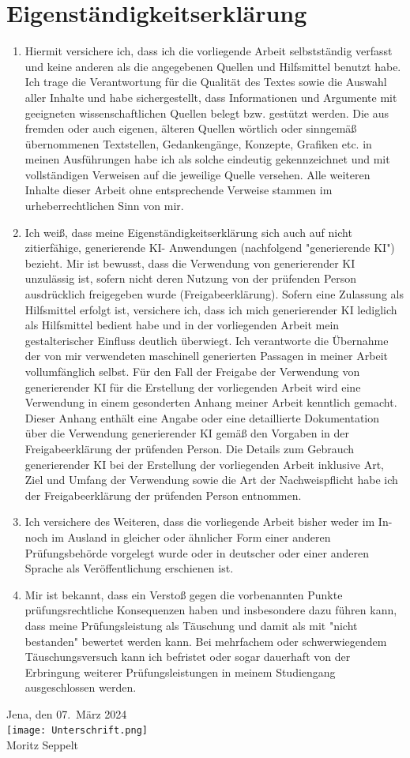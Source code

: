 \documentclass{report}
\theoremstyle{definition}
\begin{document}
\section*{Eigenständigkeitserklärung}
\begin{enumerate}
  \item Hiermit versichere ich, dass ich die vorliegende Arbeit selbstständig verfasst und keine
  anderen als die angegebenen Quellen und Hilfsmittel benutzt habe.
  Ich trage die Verantwortung für die Qualität des Textes sowie die Auswahl aller Inhalte und habe sichergestellt, dass Informationen und Argumente mit geeigneten wissenschaftlichen Quellen belegt bzw. gestützt werden. Die aus fremden oder auch eigenen, älteren Quellen wörtlich oder sinngemäß übernommenen Textstellen, Gedankengänge, Konzepte, Grafiken etc. in meinen Ausführungen habe ich als solche eindeutig gekennzeichnet und mit vollständigen Verweisen auf die jeweilige Quelle versehen. Alle weiteren Inhalte dieser Arbeit ohne entsprechende Verweise
  stammen im urheberrechtlichen Sinn von mir.
  \item Ich weiß, dass meine Eigenständigkeitserklärung sich auch auf nicht zitierfähige, generierende KI-
  Anwendungen (nachfolgend "generierende KI") bezieht.
  Mir ist bewusst, dass die Verwendung von generierender KI unzulässig ist, sofern nicht deren
  Nutzung von der prüfenden Person ausdrücklich freigegeben wurde (Freigabeerklärung). Sofern
  eine Zulassung als Hilfsmittel erfolgt ist, versichere ich, dass ich mich generierender KI lediglich als
  Hilfsmittel bedient habe und in der vorliegenden Arbeit mein gestalterischer Einfluss deutlich
  überwiegt. Ich verantworte die Übernahme der von mir verwendeten maschinell generierten
  Passagen in meiner Arbeit vollumfänglich selbst.
  Für den Fall der Freigabe der Verwendung von generierender KI für die Erstellung der vorliegenden
  Arbeit wird eine Verwendung in einem gesonderten Anhang meiner Arbeit kenntlich gemacht.
  Dieser Anhang enthält eine Angabe oder eine detaillierte Dokumentation über die Verwendung
  generierender KI gemäß den Vorgaben in der Freigabeerklärung der prüfenden Person.
  Die Details zum Gebrauch generierender KI bei der Erstellung der vorliegenden Arbeit inklusive Art,
  Ziel und Umfang der Verwendung sowie die Art der Nachweispflicht habe ich der Freigabeerklärung
  der prüfenden Person entnommen.
  \item Ich versichere des Weiteren, dass die vorliegende Arbeit bisher weder im In- noch im Ausland in
  gleicher oder ähnlicher Form einer anderen Prüfungsbehörde vorgelegt wurde oder in deutscher
  oder einer anderen Sprache als Veröffentlichung erschienen ist.
  \item Mir ist bekannt, dass ein Verstoß gegen die vorbenannten Punkte prüfungsrechtliche
  Konsequenzen haben und insbesondere dazu führen kann, dass meine Prüfungsleistung als
  Täuschung und damit als mit "nicht bestanden" bewertet werden kann. Bei mehrfachem oder
  schwerwiegendem Täuschungsversuch kann ich befristet oder sogar dauerhaft von der Erbringung
  weiterer Prüfungsleistungen in meinem Studiengang ausgeschlossen werden.
\end{enumerate}
\vspace{1cm}
Jena, den 07.\ März 2024
\vspace{0.5cm}\\
\texttt{[image: Unterschrift.png]}\\
Moritz Seppelt
\end{document}

